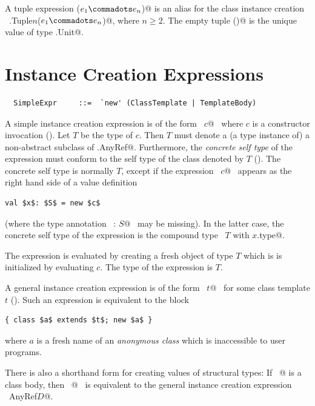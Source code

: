 A tuple expression \lstinline@($e_1 \commadots e_n$)@ is an alias
for the class instance creation 
~\lstinline@scala.Tuple$n$($e_1 \commadots e_n$)@, where $n \geq 2$.  
The empty tuple
\lstinline@()@ is the unique value of type \lstinline@scala.Unit@.

\section{Instance Creation Expressions}
\label{sec:inst-creation}

\syntax\begin{lstlisting}
  SimpleExpr     ::=  `new' (ClassTemplate | TemplateBody)
\end{lstlisting}

A simple instance creation expression is of the form 
~\lstinline@new $c$@~ 
where $c$ is a constructor invocation
().  Let $T$ be the type of $c$. Then $T$ must
denote a (a type instance of) a non-abstract subclass of
\lstinline@scala.AnyRef@. Furthermore, the {\em concrete self type} of the
expression must conform to the self type of the class denoted by $T$
(). The concrete self type is normally
$T$, except if the expression ~\lstinline@new $c$@~ appears as the
right hand side of a value definition
\begin{lstlisting}
val $x$: $S$ = new $c$
\end{lstlisting}
(where the type annotation ~\lstinline@: $S$@~ may be missing).
In the latter case, the concrete self type of the expression is the
compound type ~\lstinline@$T$ with $x$.type@.

The expression is evaluated by creating a fresh
object of type $T$ which is is initialized by evaluating $c$. The
type of the expression is $T$.

A general instance creation expression is of the form 
~\lstinline@new $t$@~ for some class template $t$ ().
Such an expression is equivalent to the block
\begin{lstlisting}
{ class $a$ extends $t$; new $a$ }
\end{lstlisting}
where $a$ is a fresh name of an {\em anonymous class} which is
inaccessible to user programs.

There is also a shorthand form for creating values of structural
types: If ~@ is a class body, then 
~@~ is equivalent to the general instance creation expression
~\lstinline@new AnyRef{$D$}@.


